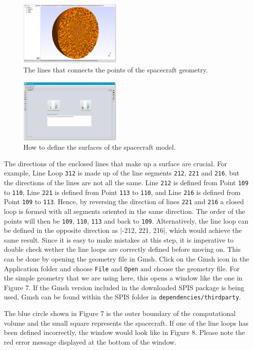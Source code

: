 \documentclass[a4paper, 11pt]{article}
\begin{document}
\begin{figure}[!ht]
    \centering
    \includegraphics[width=0.45\textwidth]{fig5.jpg}
    \caption{The lines that connects the points of the spacecraft geometry.}
\end{figure}

\begin{figure}[!ht]
    \centering
    \includegraphics[width=0.45\textwidth]{fig6.jpg}
    \caption{How to define the surfaces of the spacecraft model.}
\end{figure}

The directions of the enclosed lines that make up a surface are crucial. For example, Line Loop \verb|312| is made up of the line segments \verb|212|, \verb|221| and \verb|216|, but the directions of the lines are not all the same. Line \verb|212| is defined from Point \verb|109| to \verb|110|, Line \verb|221| is defined from Point \verb|113| to \verb|110|, and Line \verb|216| is defined from Point \verb|109| to \verb|113|. Hence, by reversing the direction of lines \verb|221| and \verb|216| a closed loop is formed with all segments oriented in the same direction. The order of the points will then be \verb|109|, \verb|110|, \verb|113| and back to \verb|109|. Alternatively, the line loop can be defined in the opposite direction as |{-212, 221, 216}|, which would achieve the same result. Since it is easy to make mistakes at this step, it is imperative to double check wether the line loops are correctly defined before moving on. This can be done by opening the geometry file in Gmsh. Click on the Gmsh icon in the Application folder and choose \verb|File| and \verb|Open| and choose the geometry file. For the simple geometry that we are using here, this opens a window like the one in Figure 7. If the Gmsh version included in the downloaded SPIS package is being used, Gmsh can be found within the SPIS folder in \verb|dependencies/thirdparty|.\par
The blue circle shown in Figure 7 is the outer boundary of the computational volume and the small square represents the spacecraft. If one of the line loops has been defined incorrectly, the window would look like in Figure 8. Please note the red error message displayed at the bottom of the window.
\end{document}
